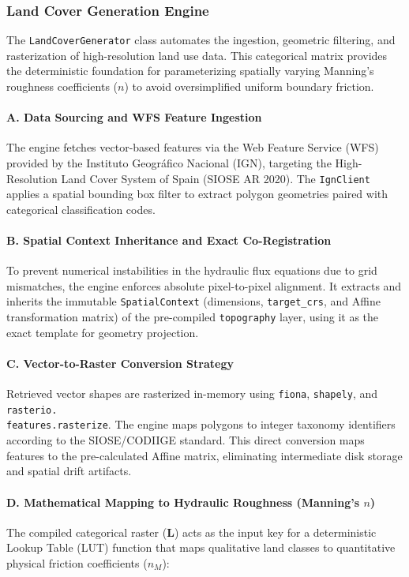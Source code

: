 \subsubsection{Land Cover Generation Engine}

The \texttt{LandCoverGenerator} class automates the ingestion, geometric filtering, and rasterization of high-resolution land use data. This categorical matrix provides the deterministic foundation for parameterizing spatially varying Manning's roughness coefficients ($n$) to avoid oversimplified uniform boundary friction.

\paragraph{A. Data Sourcing and WFS Feature Ingestion}
The engine fetches vector-based features via the Web Feature Service (WFS) provided by the Instituto Geográfico Nacional (IGN), targeting the High-Resolution Land Cover System of Spain (SIOSE AR 2020). The \texttt{IgnClient} applies a spatial bounding box filter to extract polygon geometries paired with categorical classification codes.

\paragraph{B. Spatial Context Inheritance and Exact Co-Registration}
To prevent numerical instabilities in the hydraulic flux equations due to grid mismatches, the engine enforces absolute pixel-to-pixel alignment. It extracts and inherits the immutable \texttt{SpatialContext} (dimensions, \texttt{target\_crs}, and Affine transformation matrix) of the pre-compiled \texttt{topography} layer, using it as the exact template for geometry projection.

\paragraph{C. Vector-to-Raster Conversion Strategy}
Retrieved vector shapes are rasterized in-memory using \texttt{fiona}, \texttt{shapely}, and \texttt{rasterio. \\ features.rasterize}. The engine maps polygons to integer taxonomy identifiers according to the SIOSE/CODIIGE standard. This direct conversion maps features to the pre-calculated Affine matrix, eliminating intermediate disk storage and spatial drift artifacts.

\paragraph{D. Mathematical Mapping to Hydraulic Roughness (Manning's $n$)}
The compiled categorical raster ($\mathbf{L}$) acts as the input key for a deterministic Lookup Table (LUT) function that maps qualitative land classes to quantitative physical friction coefficients ($n_M$):

